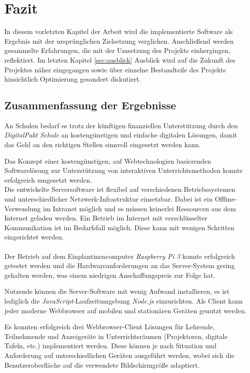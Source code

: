  \section{Fazit}\label{sec:auswertung}
In diesem vorletzten Kapitel der Arbeit wird die implementierte Software als Ergebnis mit der ursprünglichen Zielsetzung verglichen. Anschließend werden gesammelte Erfahrungen, die mit der Umsetzung des Projekts einhergingen, reflektiert. 
Im letzten Kapitel {\ref{sec:ausblick} Ausblick} wird auf die Zukunft des Projektes näher eingegangen sowie über einzelne Bestandteile des Projekts hinsichtlich Optimierung gesondert diskutiert.

\subsection{Zusammenfassung der Ergebnisse}\label{sec:umvsplan}
An Schulen bedarf es trotz der künftigen finanziellen Unterstützung durch den \emph{DigitalPakt Schule} an kostengünstigen und einfache digitalen Lösungen, damit das Geld an den richtigen Stellen sinnvoll eingesetzt werden kann.

Das Konzept einer kostengünstigen, auf Webtechnologien basierenden Softwarelösung zur Unterstützung von interaktiven Unterrichtsmethoden konnte erfolgreich umgesetzt werden.\\
 
Die entwickelte Serversoftware ist flexibel auf verschiedenen Betriebssystemen und unterschiedlicher Netzwerk-Infrastruktur einsetzbar. Dabei ist ein Offline-Verwendung im Intranet möglich und es müssen keinerlei Ressourcen aus dem Internet geladen werden. Ein Betrieb im Internet mit verschlüsselter Kommunikation ist im Bedarfsfall möglich. Diese kann mit wenigen Schritten eingerichtet werden. 
\\ \\
Der Betrieb auf dem Einplantinencomputer \emph{Raspberry Pi 3} konnte erfolgreich getestet werden und die Hardwareanforderungen an das Server-System gering gehalten werden, was einem niedrigen Anschaffungspreis zur Folge hat.  

Nutzende können die Server-Software mit wenig Aufwand installieren, es ist
lediglich die \emph{JavaScript}-Laufzeitumgebung \emph{Node.js} einzurichten. Als Client kann jeder moderne Webbrowser auf mobilen und stationären Geräten genutzt werden. 

Es konnten erfolgreich drei Webbrowser-Client Lösungen für Lehrende, Teilnehmende und Anzeigeräte in Unterrichtsräumen (Projektoren, digitale Tafeln, etc.) implementiert werden. 
Diese können je nach Situation und Anforderung auf unterschiedlichen Geräten ausgeführt werden, wobei sich die Benutzeroberfläche auf die verwendete Bildschirmgröße adaptiert. \\ 

